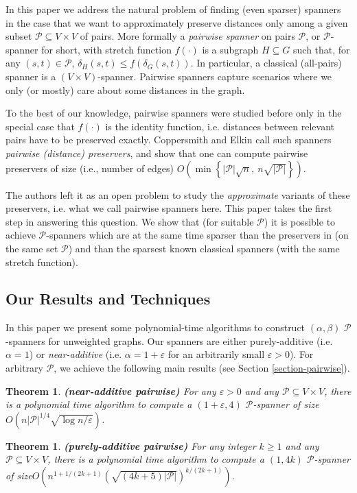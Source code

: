 \documentclass[a4paper,11pt]{article}
\newtheorem{theorem}[lemma]{Theorem}
\theoremstyle{definition}
\newcommand{\cP}{\mathcal{P}}
\newcommand{\eps}{\varepsilon}
\begin{document}
In this paper we address the natural problem of finding (even sparser) spanners in the case that we want to approximately preserve distances only among a given subset $\cP\subseteq V\times V$ of pairs. More formally a \emph{pairwise spanner} on pairs $\cP$, or $\cP$-spanner for short, with stretch function $f(\cdot)$ is a subgraph $H\subseteq G$ such that, for any $(s,t)\in \cP$, $\delta_H(s,t)\leq f(\delta_G(s,t))$. In particular, a classical (all-pairs) spanner is a $(V\times V)$-spanner. Pairwise spanners capture scenarios where we only (or mostly) care about some distances in the graph. 

To the best of our knowledge, pairwise spanners were studied before only in the special case that $f(\cdot)$ is the identity function, i.e.  distances between relevant pairs have to be preserved exactly.  Coppersmith and Elkin \cite{CE05} call such spanners \emph{pairwise (distance) preservers}, and show that one can compute pairwise preservers of size (i.e., number of edges) $O(\min\left\{|\cP|\sqrt{n}, \ n\sqrt{|\cP|}\right\})$. 

The authors left it as an open problem to study the {\em approximate} variants of these 
preservers, i.e. what we call pairwise spanners here. This paper takes the first step in answering this question. We show that (for suitable $\cP$) it is possible to achieve $\cP$-spanners which are at the same time sparser than the preservers in \cite{CE05} (on the same set $\cP$) and than the sparsest known classical spanners (with the same stretch function). 








\subsection{Our Results and Techniques}

In this paper we present some polynomial-time algorithms to construct $(\alpha,\beta)$ $\cP$-spanners for unweighted graphs. Our spanners are either purely-additive (i.e. $\alpha=1$) or \emph{near-additive} (i.e. $\alpha=1+\eps$ for an arbitrarily small $\eps>0$). 
For arbitrary $\cP$, we achieve the following main results (see Section \ref{section-pairwise}).
\begin{theorem}
\label{thm:pairwise} {\bf (near-additive pairwise)}
For any $\eps>0$ and any $\cP\subseteq V\times V$, there is a polynomial time algorithm to compute a $(1+\eps,4)$ $\cP$-spanner of size $O(n|\cP|^{1/4}\sqrt{\log n / \eps})$. 
\end{theorem}
\begin{theorem}
\label{thm:pairwise2} {\bf (purely-additive pairwise)}
For any integer $k\geq 1$ and any $\cP\subseteq V\times V$, there is a polynomial time algorithm to compute a $(1,4k)$ $\cP$-spanner of size\newline $O(n^{1+1/(2k+1)}(\sqrt{(4k+5)|\cP|})^{k/(2k+1)})$.
\end{theorem}
\end{document}
